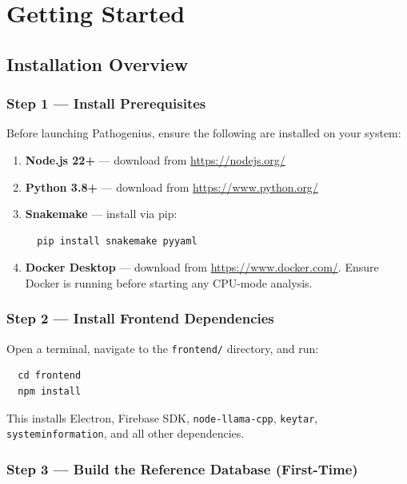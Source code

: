 \documentclass[12pt,a4paper]{report}
\begin{document}
\chapter{Getting Started}

\section{Installation Overview}

\subsection{Step 1 — Install Prerequisites}

Before launching Pathogenius, ensure the following are installed on your system:

\begin{enumerate}[leftmargin=1.5em]
  \item \textbf{Node.js 22+} — download from \url{https://nodejs.org/}
  \item \textbf{Python 3.8+} — download from \url{https://www.python.org/}
  \item \textbf{Snakemake} — install via pip:
    \begin{verbatim}
  pip install snakemake pyyaml
    \end{verbatim}
  \item \textbf{Docker Desktop} — download from \url{https://www.docker.com/}. Ensure Docker is running before starting any CPU-mode analysis.
\end{enumerate}

\subsection{Step 2 — Install Frontend Dependencies}

Open a terminal, navigate to the \texttt{frontend/} directory, and run:

\begin{verbatim}
  cd frontend
  npm install
\end{verbatim}

This installs Electron, Firebase SDK, \texttt{node-llama-cpp}, \texttt{keytar}, \texttt{systeminformation}, and all other dependencies.

\subsection{Step 3 — Build the Reference Database (First-Time)}
\end{document}
